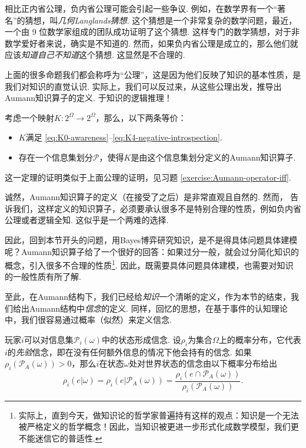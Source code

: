 相比正内省公理，负内省公理可能会引起一些争议. 例如，在数学界有一个“著名”的猜想，叫\textit{几何Langlands猜想}. 这个猜想是一个非常复杂的数学问题，最近，一个由 9 位数学家组成的团队成功证明了这个猜想. 这样专门的数学猜想，对于非数学爱好者来说，确实是不知道的. 然而，如果负内省公理是成立的，那么他们就应该\textit{知道自己不知道}这个猜想. 这显然是不合理的.

上面的很多命题我们都会称呼为“公理”，这是因为他们反映了知识的基本性质，是我们对知识的直觉认识. 实际上，我们可以反过来，从这些公理出发，推导出Aumann知识算子的定义. 
于知识的逻辑推理！

\begin{theorem}\label{thm:Aumann-operator-iff}
考虑一个映射$K:2^\Omega\to 2^\Omega$，那么，以下两条等价：
\begin{itemize}
    \item $K$满足 \eqref{eq:K0-awareness}--\eqref{eq:K4-negative-introspection}.
    \item 存在一个信息集划分$\mathcal P$，使得$K$是由这个信息集划分定义的Aumann知识算子.
\end{itemize}
\end{theorem}

这一定理的证明类似于上面公理的证明，见习题 \ref{exercise:Aumann-operator-iff}.

诚然，Aumann知识算子的定义（在接受了之后）是非常直观且自然的. 然而， 告诉我们，这样定义的知识算子，必须要承认很多不是特别合理的性质，例如负内省公理或者逻辑全知. 这似乎是一个两难的选择. 

因此，回到本节开头的问题，用Bayes博弈研究知识，是不是得具体问题具体建模呢？Aumann知识算子给了一个很好的回答：如果过分一般，就会过分简化知识的概念，引入很多不合理的性质\footnote{实际上，直到今天，做知识论的哲学家普遍持有这样的观点：知识是一个无法被严格定义的哲学概念！因此，当知识被更进一步形式化成数学模型，我们更不能迷信它的普适性.}. 因此，既需要具体问题具体建模，也需要对知识的一般性质有所了解.

至此，在Aumann结构下，我们已经给\textit{知识}一个清晰的定义，作为本节的结束，我们给出Aumann结构中\textit{信念}的定义. 同样，回忆的思想，在基于事件的认知理论中，我们很容易通过概率（似然）来定义信念. 

玩家$i$可以对信息集$\mathcal P_i(\omega)$中的状态形成信念. 设$\rho_i$为集合$\Omega$上的概率分布，它代表$i$的\textit{先验}信念，即在没有任何额外信息的情况下他会持有的信念. 如果$\rho_i(\mathcal P_A(\omega)) > 0$，那么$i$在状态$\omega$处对世界状态的信念由以下概率分布给出
\[\rho_i(e|\omega)=\rho_i(e|\mathcal P_A(\omega)) = \frac{\rho_i(e\cap\mathcal P_A(\omega))}{\rho_i(\mathcal P_A(\omega))}.\]

